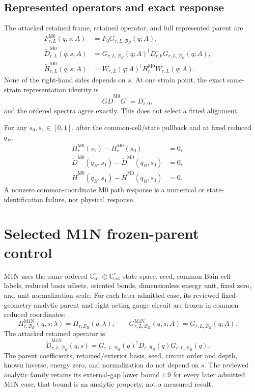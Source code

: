 \documentclass[11pt]{article}
\newcommand{\CC}{\mathbb C}
\newcommand{\BB}{\mathcal B_B}
\begin{document}
\subsection{Represented operators and exact response}

The attacked retained frame, retained operator, and full represented parent are
\begin{align}
 F^{\mathrm{M0}}_{r,L}(q,s;A)
 &=F_0G_{r,L,\BB}(q;A),\\
 \widetilde D^{\mathrm{M0}}_{r,L}(q,s;A)
 &=G_{r,L,\BB}(q;A)^\dagger D^-_{r,0}G_{r,L,\BB}(q;A),\\
 \widetilde H^{\mathrm{M0}}_{r,L}(q,s;A)
 &=W_{r,L}(q;A)^\dagger H_r^{\mathrm{M0}}W_{r,L}(q;A).
\end{align}
None of the right-hand sides depends on $s$.  At one strain point, the exact
same-strain representation identity is
\begin{equation}
 G\widetilde D^{\mathrm{M0}}G^\dagger=D^-_{r,0},
\end{equation}
and the ordered spectra agree exactly.  This does not select a fitted alignment.

For any $s_0,s_1\in[0,1]$, after the common-cell/state pullback and at fixed reduced
$q_B$,
\begin{align}
 H_r^{\mathrm{M0}}(s_1)-H_r^{\mathrm{M0}}(s_0)&=0,\\
 \widetilde D^{\mathrm{M0}}(q_B,s_1)-
 \widetilde D^{\mathrm{M0}}(q_B,s_0)&=0,\\
 \widetilde H^{\mathrm{M0}}(q_B,s_1)-
 \widetilde H^{\mathrm{M0}}(q_B,s_0)&=0.
\end{align}
A nonzero common-coordinate M0 path response is a numerical or state-identification
failure, not physical response.

\section{Selected M1N frozen-parent control}

M1N uses the same ordered $\CC^r_{\mathrm{ret}}\oplus\CC^r_{\mathrm{ext}}$ state space,
seed, common Bain cell labels, reduced basis offsets, oriented bonds, dimensionless
energy unit, fixed zero, and unit normalization scale.  For each later admitted case,
its reviewed fixed-geometry analytic parent and right-acting gauge circuit are frozen in
common reduced coordinates:
\begin{equation}
 H^{\mathrm{M1N}}_{r,\BB}(q,s;\lambda)
 =H_{r,\BB}(q;\lambda),
 \qquad
 G^{\mathrm{M1N}}_{r,L,\BB}(q,s;A)
 =G_{r,L,\BB}(q;A).
\end{equation}
The attacked retained operator is
\begin{equation}
 \widetilde D^{\mathrm{M1N}}_{r,L,\BB}(q,s)
 =G_{r,L,\BB}(q)^\dagger
 D_{r,\BB}(q)G_{r,L,\BB}(q).
\end{equation}
The parent coefficients, retained/exterior basis, seed, circuit order and depth, known
inverse, energy zero, and normalization do not depend on $s$.  The reviewed analytic
family retains its external-gap lower bound $1.9$ for every later admitted M1N case;
that bound is an analytic property, not a measured result.
\end{document}
